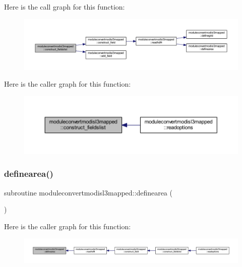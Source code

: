Here is the call graph for this function\+:\nopagebreak
\begin{figure}[H]
\begin{center}
\leavevmode
\includegraphics[width=350pt]{namespacemoduleconvertmodisl3mapped_a9ccec60dccec78cdbd1bb6e2b82e4c6b_cgraph}
\end{center}
\end{figure}
Here is the caller graph for this function\+:\nopagebreak
\begin{figure}[H]
\begin{center}
\leavevmode
\includegraphics[width=350pt]{namespacemoduleconvertmodisl3mapped_a9ccec60dccec78cdbd1bb6e2b82e4c6b_icgraph}
\end{center}
\end{figure}
\mbox{\label{namespacemoduleconvertmodisl3mapped_aa45a197b9dfbeea974438b114ede6c92}} 
\subsubsection{\texorpdfstring{definearea()}{definearea()}}
{\footnotesize\ttfamily subroutine moduleconvertmodisl3mapped\+::definearea (\begin{DoxyParamCaption}{ }\end{DoxyParamCaption})\hspace{0.3cm}{\ttfamily [private]}}

Here is the caller graph for this function\+:\nopagebreak
\begin{figure}[H]
\begin{center}
\leavevmode
\includegraphics[width=350pt]{namespacemoduleconvertmodisl3mapped_aa45a197b9dfbeea974438b114ede6c92_icgraph}
\end{center}
\end{figure}
\mbox{\label{namespacemoduleconvertmodisl3mapped_a82cd68f8503b3a5bf96e529ac4715405}} 
